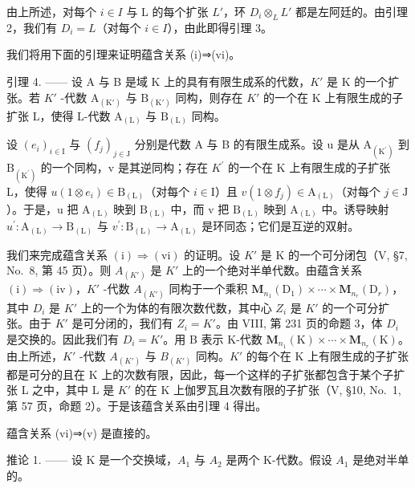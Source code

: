 由上所述，对每个 \(i \in I\) 与 L 的每个扩张 \(L'\)，环 \(D_{i} \otimes_{L} L'\) 都是左阿廷的。由引理 2，我们有 \(D_{i} = L\)（对每个 \(i \in I\)），由此即得引理 3。

我们将用下面的引理来证明蕴含关系 (i)⇒(vi)。

引理 4. —— 设 A 与 B 是域 K 上的具有有限生成系的代数，\(K'\) 是 K 的一个扩张。若 \(K'\) -代数 \(\mathrm{A}_{(\mathrm{K}')}\) 与 \(\mathrm{B}_{(\mathrm{K}')}\) 同构，则存在 \(K'\) 的一个在 K 上有限生成的子扩张 L，使得 L-代数 \(\mathrm{A}_{(\mathrm{L})}\) 与 \(\mathrm{B}_{(\mathrm{L})}\) 同构。

设 \((e_{i})_{i\in\mathrm{I}}\) 与 \((f_{j})_{j\in\mathrm{J}}\) 分别是代数 A 与 B 的有限生成系。设 u 是从 \(\mathrm{A}_{(\mathrm{K}^{\prime})}\) 到 \(\mathrm{B}_{(\mathrm{K}^{\prime})}\) 的一个同构，v 是其逆同构；存在 \(K^{\prime}\) 的一个在 K 上有限生成的子扩张 L，使得 \(u(1\otimes e_{i})\in\mathrm{B}_{(\mathrm{L})}\)（对每个 \(i\in\mathrm{I}\)）且 \(v(1\otimes f_{j})\in\mathrm{A}_{(\mathrm{L})}\)（对每个 \(j\in\mathrm{J}\)）。于是，u 把 \(\mathrm{A}_{(\mathrm{L})}\) 映到 \(\mathrm{B}_{(\mathrm{L})}\) 中，而 v 把 \(\mathrm{B}_{(\mathrm{L})}\) 映到 \(\mathrm{A}_{(\mathrm{L})}\) 中。诱导映射 \(u^{\prime}:\mathrm{A}_{(\mathrm{L})}\to\mathrm{B}_{(\mathrm{L})}\) 与 \(v^{\prime}:\mathrm{B}_{(\mathrm{L})}\to\mathrm{A}_{(\mathrm{L})}\) 是环同态；它们是互逆的双射。

我们来完成蕴含关系 \((\mathrm{i})\Rightarrow(\mathrm{vi})\) 的证明。设 \(K'\) 是 K 的一个可分闭包（V, §7, No.~8, 第 45 页）。则 \(A_{(K')}\) 是 \(K'\) 上的一个绝对半单代数。由蕴含关系 \((\mathrm{i})\Rightarrow(\mathrm{iv})\)，\(K'\) -代数 \(A_{(K')}\) 同构于一个乘积 \(\mathbf{M}_{n_{1}}(\mathrm{D}_{1})\times\cdots\times\mathbf{M}_{n_{r}}(\mathrm{D}_{r})\)，其中 \(D_{i}\) 是 \(K'\) 上的一个为体的有限次数代数，其中心 \(Z_{i}\) 是 \(K'\) 的一个可分扩张。由于 \(K'\) 是可分闭的，我们有 \(Z_{i}=K'\)。由 VIII, 第 231 页的命题 3，体 \(D_{i}\) 是交换的。因此我们有 \(D_{i}=K'\)。用 B 表示 K-代数 \(\mathbf{M}_{n_{1}}(\mathrm{K})\times\cdots\times\mathbf{M}_{n_{r}}(\mathrm{K})\)。由上所述，\(K'\) -代数 \(A_{(K')}\) 与 \(B_{(K')}\) 同构。\(K'\) 的每个在 K 上有限生成的子扩张都是可分的且在 K 上的次数有限，因此，每一个这样的子扩张都包含于某个子扩张 L 之中，其中 L 是 \(K'\) 的在 K 上伽罗瓦且次数有限的子扩张（V, §10, No.~1, 第 57 页，命题 2）。于是该蕴含关系由引理 4 得出。

蕴含关系 (vi)⇒(v) 是直接的。

推论 1. —— 设 K 是一个交换域，\(A_{1}\) 与 \(A_{2}\) 是两个 K-代数。假设 \(A_{1}\) 是绝对半单的。

